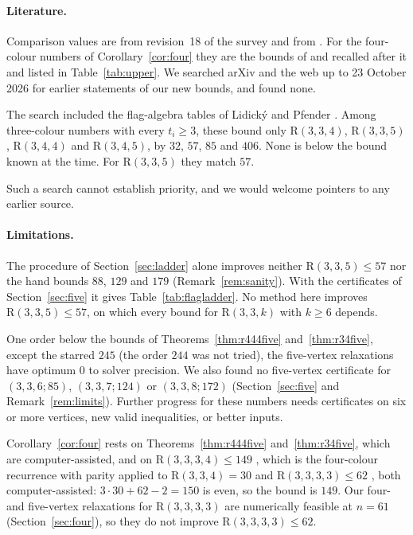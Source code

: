 \documentclass[11pt]{article}
\theoremstyle{spacedplain}
\theoremstyle{spaceddef}
\theoremstyle{spacedremark}
\newcommand{\R}{\mathrm{R}}
\begin{document}
\paragraph{Literature.}\label{sec:lit}
Comparison values are from revision~18 of the survey \cite{Rad26} and from \cite{Boz26}.
For the four-colour numbers of Corollary~\ref{cor:four} they are the bounds of \cite{Rad26} and \cite{Boz26} recalled after it and listed in Table~\ref{tab:upper}.
We searched arXiv and the web up to 23 October 2026 for earlier statements of our new bounds, and found none.

The search included the flag-algebra tables of Lidick\'y and Pfender \cite{LP21}.
Among three-colour numbers with every $t_i\ge 3$, these bound only $\R(3,3,4)$, $\R(3,3,5)$, $\R(3,4,4)$ and $\R(3,4,5)$, by $32$, $57$, $85$ and $406$.
None is below the bound known at the time.
For $\R(3,3,5)$ they match $57$.

Such a search cannot establish priority, and we would welcome pointers to any earlier source.

\paragraph{Limitations.}
The procedure of Section~\ref{sec:ladder} alone improves neither $\R(3,3,5)\le 57$ nor the hand bounds $88$, $129$ and $179$ (Remark~\ref{rem:sanity}).
With the certificates of Section~\ref{sec:five} it gives Table~\ref{tab:flagladder}.
No method here improves $\R(3,3,5)\le 57$, on which every bound for $\R(3,3,k)$ with $k\ge 6$ depends.

One order below the bounds of Theorems~\ref{thm:r444five} and~\ref{thm:r34five}, except the starred $245$ (the order $244$ was not tried), the five-vertex relaxations have optimum $0$ to solver precision.
We also found no five-vertex certificate for $(3,3,6;85)$, $(3,3,7;124)$ or $(3,3,8;172)$ (Section~\ref{sec:five} and Remark~\ref{rem:limits}).
Further progress for these numbers needs certificates on six or more vertices, new valid inequalities, or better inputs.

Corollary~\ref{cor:four} rests on Theorems~\ref{thm:r444five} and~\ref{thm:r34five}, which are computer-assisted, and on $\R(3,3,3,4)\le 149$ \cite[6.1(h)]{Rad26}, which is the four-colour recurrence with parity \cite[6.1(a)]{Rad26} applied to $\R(3,3,4)=30$ \cite{CFIM16} and $\R(3,3,3,3)\le 62$ \cite{FKR04}, both computer-assisted: $3\cdot 30+62-2=150$ is even, so the bound is $149$.
Our four- and five-vertex relaxations for $\R(3,3,3,3)$ are numerically feasible at $n=61$ (Section~\ref{sec:four}), so they do not improve $\R(3,3,3,3)\le 62$.
\end{document}
